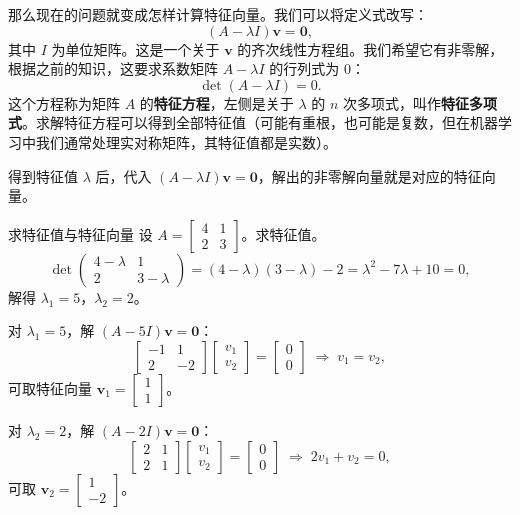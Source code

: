 那么现在的问题就变成怎样计算特征向量。我们可以将定义式改写：
\[
    (A - \lambda I)\mathbf{v} = \mathbf{0},
\]
其中 \(I\) 为单位矩阵。这是一个关于 \(\mathbf{v}\) 的齐次线性方程组。我们希望它有非零解，根据之前的知识，这要求系数矩阵 \(A - \lambda I\) 的行列式为 \(0\)：
\[
    \det(A - \lambda I) = 0.
\]
这个方程称为矩阵 \(A\) 的\textbf{特征方程}，左侧是关于 \(\lambda\) 的 \(n\) 次多项式，叫作\textbf{特征多项式}。求解特征方程可以得到全部特征值（可能有重根，也可能是复数，但在机器学习中我们通常处理实对称矩阵，其特征值都是实数）。

得到特征值 \(\lambda\) 后，代入 \((A - \lambda I)\mathbf{v} = \mathbf{0}\)，解出的非零解向量就是对应的特征向量。

\begin{example}{求特征值与特征向量}{}
    设 \(A =
        \begin{bmatrix} 4 & 1 \\ 2 & 3
    \end{bmatrix}\)。求特征值。
    \tcblower
    \[
        \det
        \begin{pmatrix} 4-\lambda & 1 \\ 2 & 3-\lambda
        \end{pmatrix} = (4-\lambda)(3-\lambda) - 2 = \lambda^2 - 7\lambda + 10 = 0,
    \]
    解得 \(\lambda_1 = 5\)，\(\lambda_2 = 2\)。

    对 \(\lambda_1 = 5\)，解 \((A - 5I)\mathbf{v} = \mathbf{0}\)：
    \[
        \begin{bmatrix} -1 & 1 \\ 2 & -2
        \end{bmatrix}
        \begin{bmatrix} v_1 \\ v_2
        \end{bmatrix} =
        \begin{bmatrix} 0 \\ 0
        \end{bmatrix} \;\Rightarrow\; v_1 = v_2,
    \]
    可取特征向量 \(\mathbf{v}_1 =
        \begin{bmatrix}1 \\ 1
    \end{bmatrix}\)。

    对 \(\lambda_2 = 2\)，解 \((A - 2I)\mathbf{v} = \mathbf{0}\)：
    \[
        \begin{bmatrix} 2 & 1 \\ 2 & 1
        \end{bmatrix}
        \begin{bmatrix} v_1 \\ v_2
        \end{bmatrix} =
        \begin{bmatrix} 0 \\ 0
        \end{bmatrix} \;\Rightarrow\; 2v_1 + v_2 = 0,
    \]
    可取 \(\mathbf{v}_2 =
        \begin{bmatrix}1 \\ -2
    \end{bmatrix}\)。


\end{example}
